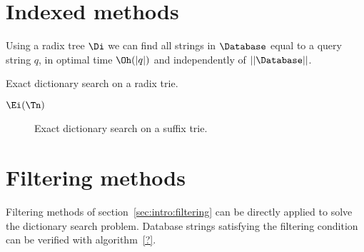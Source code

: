 \section{Indexed methods}

Using a radix tree $\Di$ we can find all strings in $\Database$ equal to a query string $q$, in optimal time $\Oh(|q|)$ and independently of $||\Database||$.

\begin{algorithm}[h]
\caption{Exact dictionary search on a radix trie.}
\label{alg:dict-exact}
\begin{algorithmic}[1]
		\State \Report $\Ei(\Tn)$
		\State {}
	\EndIf
\EndProcedure
\end{algorithmic}
\end{algorithm}

\begin{figure}[h]
\begin{center}
\caption{Exact dictionary search on a suffix trie.}
\label{fig:dict-exact}

\end{center}
\end{figure}

\section{Filtering methods}

Filtering methods of section~\ref{sec:intro:filtering} can be directly applied to solve the dictionary search problem. Database strings satisfying the filtering condition can be verified with algorithm~\ref{?}.

